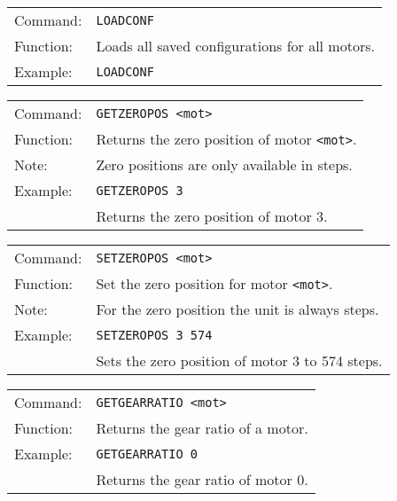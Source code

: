\vspace{\vdistace}

\begin{table}[h]
  \begin{tabularx}{\textwidth}{lX}
    Command:  & \texttt{LOADCONF}\\
    Function: & Loads all saved configurations for all motors.\\
    Example:  & \texttt{LOADCONF}
  \end{tabularx}
\end{table}

\vspace{\vdistace}

\begin{table}[h]
  \begin{tabularx}{\textwidth}{lX}
    Command:  & \texttt{GETZEROPOS <mot>}\\
    Function: & Returns the zero position of motor \texttt{<mot>}.\\
    Note:     & Zero positions are only available in steps.\\
    Example:  & \texttt{GETZEROPOS 3}\\
              & Returns the zero position of motor 3.
  \end{tabularx}
\end{table}

\vspace{\vdistace}

\begin{table}[h]
  \begin{tabularx}{\textwidth}{lX}
    Command:  & \texttt{SETZEROPOS <mot>}\\
    Function: & Set the zero position for motor \texttt{<mot>}.\\
    Note:     & For the zero position the unit is always steps.\\
    Example:  & \texttt{SETZEROPOS 3 574}\\
              & Sets the zero position of motor 3 to 574 steps.
  \end{tabularx}
\end{table}

\vspace{\vdistace}

\begin{table}[h]
  \begin{tabularx}{\textwidth}{lX}
    Command:  & \texttt{GETGEARRATIO <mot>}\\
    Function: & Returns the gear ratio of a motor.\\
    Example:  & \texttt{GETGEARRATIO 0}\\
              & Returns the gear ratio of motor 0.
  \end{tabularx}
\end{table}


